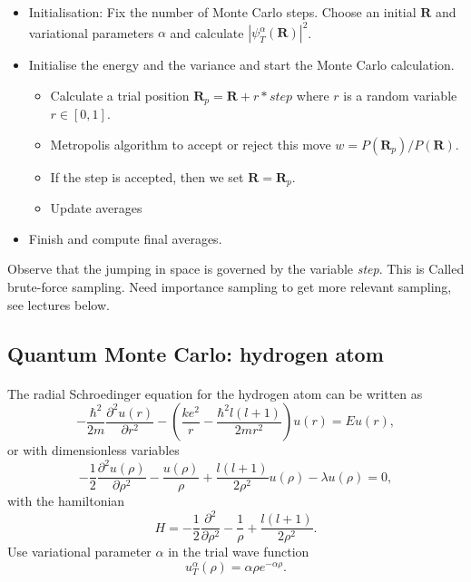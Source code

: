 \documentclass[%
twoside,                 %
final,                   %
10pt]{article}
\begin{document}
\begin{itemize}
   \item Initialisation: Fix the number of Monte Carlo steps. Choose an initial $\bm{R}$ and variational parameters $\alpha$ and calculate $\left|\psi_T^{\alpha}(\bm{R})\right|^2$. 

   \item Initialise the energy and the variance and start the Monte Carlo calculation.
\begin{itemize}

      \item Calculate  a trial position  $\bm{R}_p=\bm{R}+r*step$ where $r$ is a random variable $r \in [0,1]$.

      \item Metropolis algorithm to accept or reject this move  $w = P(\bm{R}_p)/P(\bm{R})$.

      \item If the step is accepted, then we set $\bm{R}=\bm{R}_p$. 

      \item Update averages

\end{itemize}

\noindent
   \item Finish and compute final averages.
\end{itemize}

\noindent
Observe that the jumping in space is governed by the variable \emph{step}. This is Called brute-force sampling.
Need importance sampling to get more relevant sampling, see lectures below.



\subsection*{Quantum Monte Carlo: hydrogen atom}

\paragraph{}
The radial Schroedinger equation for the hydrogen atom can be
written as
\[
-\frac{\hbar^2}{2m}\frac{\partial^2 u(r)}{\partial r^2}-
\left(\frac{ke^2}{r}-\frac{\hbar^2l(l+1)}{2mr^2}\right)u(r)=Eu(r),
\]
or with dimensionless variables
\[
-\frac{1}{2}\frac{\partial^2 u(\rho)}{\partial \rho^2}-
\frac{u(\rho)}{\rho}+\frac{l(l+1)}{2\rho^2}u(\rho)-\lambda u(\rho)=0,
\label{eq:hydrodimless1}
\]
with the hamiltonian
\[
H=-\frac{1}{2}\frac{\partial^2 }{\partial \rho^2}-
\frac{1}{\rho}+\frac{l(l+1)}{2\rho^2}.
\]
Use variational parameter $\alpha$ in the trial
wave function 
\[
   u_T^{\alpha}(\rho)=\alpha\rho e^{-\alpha\rho}. 
   \label{eq:trialhydrogen}
\]
\end{document}
